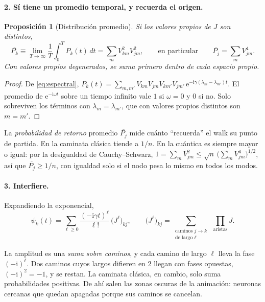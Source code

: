 \documentclass[11pt,a4paper]{article}
\newcommand{\e}{\mathrm{e}}
\newcommand{\ii}{\mathrm{i}}
\theoremstyle{plain}
\newtheorem{proposicion}{Proposición}[section]
\theoremstyle{definition}
\theoremstyle{remark}
\begin{document}
\paragraph{2. Sí tiene un promedio temporal, y recuerda el origen.}

\begin{proposicion}[Distribución promedio]\label{prop:promedio}
Si los valores propios de $J$ son distintos,
\begin{equation}
\overline{P_k}\equiv\lim_{T\to\infty}\frac1T\int_0^TP_k(t)\,dt=\sum_mV_{km}^2V_{jm}^2,
\qquad\text{en particular}\qquad
\overline{P_j}=\sum_mV_{jm}^4 .
\label{eq:promedio}
\end{equation}
Con valores propios degenerados, se suma primero dentro de cada espacio propio.
\end{proposicion}

\begin{proof}
De \eqref{eq:espectral}, $P_k(t)=\sum_{m,m'}V_{km}V_{jm}V_{km'}V_{jm'}\,\e^{-\ii\gamma(\lambda_m-\lambda_{m'})t}$. El promedio de $\e^{-\ii\omega t}$ sobre un tiempo infinito vale $1$ si $\omega=0$ y $0$ si no. Solo sobreviven los términos con $\lambda_m=\lambda_{m'}$, que con valores propios distintos son $m=m'$.
\end{proof}

La \emph{probabilidad de retorno} promedio $\overline{P_j}$ mide cuánto ``recuerda'' el walk su punto de partida. En la caminata clásica tiende a $1/n$. En la cuántica es siempre mayor o igual: por la desigualdad de Cauchy--Schwarz, $1=\sum_mV_{jm}^2\le\sqrt n\,\bigl(\sum_mV_{jm}^4\bigr)^{1/2}$, así que $\overline{P_j}\ge1/n$, con igualdad solo si el nodo pesa lo mismo en todos los modos.

\paragraph{3. Interfiere.} Expandiendo la exponencial,
\begin{equation}
\psi_k(t)=\sum_{\ell\ge0}\frac{(-\ii\gamma t)^\ell}{\ell!}\,\bigl(J^\ell\bigr)_{kj},
\qquad
\bigl(J^\ell\bigr)_{kj}=\sum_{\substack{\text{caminos }j\to k\\\text{de largo }\ell}}\;\prod_{\text{aristas}}J .
\label{eq:caminos}
\end{equation}

La amplitud es una \emph{suma sobre caminos}, y cada camino de largo $\ell$ lleva la fase $(-\ii)^\ell$. Dos caminos cuyos largos difieren en 2 llegan con fases opuestas, $(-\ii)^2=-1$, y se restan. La caminata clásica, en cambio, solo suma probabilidades positivas. De ahí salen las zonas oscuras de la animación: neuronas cercanas que quedan apagadas porque sus caminos se cancelan.
\end{document}
